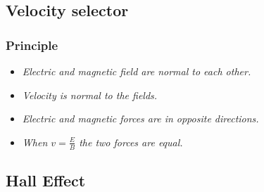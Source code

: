 \documentclass[a4paper,9pt]{scrartcl}
\begin{document}
    \subsection{Velocity selector}

    \subsubsection{Principle}
    \begin{itemize}
        \item \textit{Electric and magnetic field are normal to each other.}
        \item \textit{Velocity is normal to the fields.}
        \item \textit{Electric and magnetic forces are in opposite directions.}
        \item \textit{When $v=\frac{E}{B}$ the two forces are equal.}
    \end{itemize}

    \subsection{Hall Effect}
\end{document}
